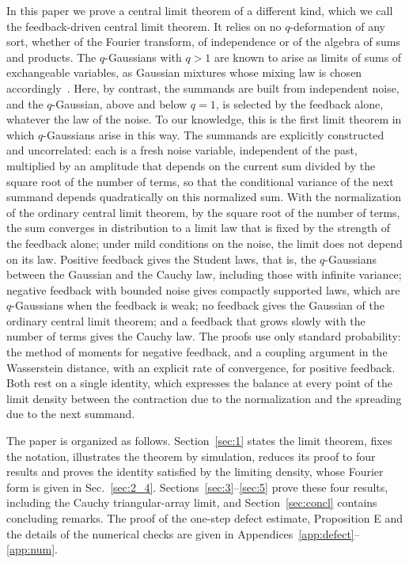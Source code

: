 \documentclass[aip,jmp,preprint,onecolumn,floatfix,superscriptaddress,nofootinbib,11pt]{revtex4-2}
\theoremstyle{plain}
\theoremstyle{remark}
\numberwithin{equation}{section}
\begin{document}
In this paper we prove a central limit theorem of a different kind, which we call the feedback-driven central limit theorem. It relies on no $q$-deformation of any sort, whether of the Fourier transform, of independence or of the algebra of sums and products. The $q$-Gaussians with $q>1$ are known to arise as limits of sums of exchangeable variables, as Gaussian mixtures whose mixing law is chosen accordingly~\cite{HJU2010}. Here, by contrast, the summands are built from independent noise, and the $q$-Gaussian, above and below $q=1$, is selected by the feedback alone, whatever the law of the noise. To our knowledge, this is the first limit theorem in which $q$-Gaussians arise in this way. The summands are explicitly constructed and uncorrelated: each is a fresh noise variable, independent of the past, multiplied by an amplitude that depends on the current sum divided by the square root of the number of terms, so that the conditional variance of the next summand depends quadratically on this normalized sum. With the normalization of the ordinary central limit theorem, by the square root of the number of terms, the sum converges in distribution to a limit law that is fixed by the strength of the feedback alone; under mild conditions on the noise, the limit does not depend on its law. Positive feedback gives the Student laws, that is, the $q$-Gaussians between the Gaussian and the Cauchy law, including those with infinite variance; negative feedback with bounded noise gives compactly supported laws, which are $q$-Gaussians when the feedback is weak; no feedback gives the Gaussian of the ordinary central limit theorem; and a feedback that grows slowly with the number of terms gives the Cauchy law. The proofs use only standard probability: the method of moments for negative feedback, and a coupling argument in the Wasserstein distance, with an explicit rate of convergence, for positive feedback. Both rest on a single identity, which expresses the balance at every point of the limit density between the contraction due to the normalization and the spreading due to the next summand.

The paper is organized as follows. Section~\ref{sec:1} states the limit theorem, fixes the notation, illustrates the theorem by simulation, reduces its proof to four results and proves the identity satisfied by the limiting density, whose Fourier form is given in Sec.~\ref{sec:2_4}. Sections~\ref{sec:3}--\ref{sec:5} prove these four results, including the Cauchy triangular-array limit, and Section~\ref{sec:concl} contains concluding remarks. The proof of the one-step defect estimate, Proposition E and the details of the numerical checks are given in Appendices~\ref{app:defect}--\ref{app:num}.
\end{document}
